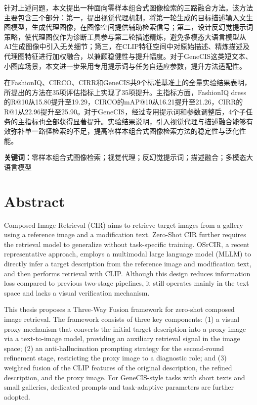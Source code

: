 \documentclass[12pt,a4paper,UTF8,oneside,openany]{ctexrep}
\begin{document}
针对上述问题，本文提出一种面向零样本组合式图像检索的三路融合方法。该方法主要包含三个部分：第一，提出视觉代理机制，将第一轮生成的目标描述输入文生图模型，生成代理图像，在图像空间提供辅助检索信号；第二，设计反幻觉提示词策略，使代理图仅作为诊断工具参与第二轮描述精炼，避免多模态大语言模型从AI生成图像中引入无关细节；第三，在CLIP特征空间中对原始描述、精炼描述及代理图特征进行加权融合，以兼顾稳健性与提升幅度。对于GeneCIS这类短文本、小图库场景，本文进一步采用专用提示词与任务自适应参数，提升方法适配性。

在FashionIQ、CIRCO、CIRR和GeneCIS共9个标准基准上的全量实验结果表明，所提出的方法在35项评估指标上实现了35项提升。主指标方面，FashionIQ dress的R@10从15.80提升至19.29，CIRCO的mAP@10从16.21提升至21.26，CIRR的R@1从22.96提升至25.90。对于GeneCIS，经过专用提示词和参数调整后，4个子任务的主指标也全部获得显著提升。实验结果说明，引入视觉代理与描述融合能够有效弥补单一路径检索的不足，提高零样本组合式图像检索方法的稳定性与泛化性能。

\vspace{1em}
\noindent\textbf{关键词：}零样本组合式图像检索；视觉代理；反幻觉提示词；描述融合；多模态大语言模型

\chapter*{Abstract}

Composed Image Retrieval (CIR) aims to retrieve target images from a gallery using a reference image and a modification text. Zero-Shot CIR further requires the retrieval model to generalize without task-specific training. OSrCIR, a recent representative approach, employs a multimodal large language model (MLLM) to directly infer a target description from the reference image and modification text, and then performs retrieval with CLIP. Although this design reduces information loss compared to previous two-stage pipelines, it still operates mainly in the text space and lacks a visual verification mechanism.

This thesis proposes a Three-Way Fusion framework for zero-shot composed image retrieval. The framework consists of three key components: (1) a visual proxy mechanism that converts the initial target description into a proxy image via a text-to-image model, providing an auxiliary retrieval signal in the image space; (2) an anti-hallucination prompting strategy for the second-round refinement stage, restricting the proxy image to a diagnostic role; and (3) weighted fusion of the CLIP features of the original description, the refined description, and the proxy image. For GeneCIS-style tasks with short texts and small galleries, dedicated prompts and task-adaptive parameters are further adopted.
\end{document}
